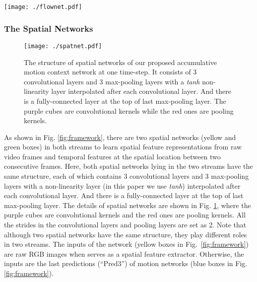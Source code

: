 \documentclass[journal]{IEEEtran}
\begin{document}
\begin{figure*}[htb]
	\centering
	\texttt{[image: ./flownet.pdf]}
	\vspace{-3.5mm}	
	\caption{The structure of motion networks of our proposed accumulative motion context network at one time-step.  It has 6 convolutional layers (corresponding to ``Conv1'', ``Conv\_1'', ``Conv2'', ``Conv2\_1'',``Conv3'' and ``Conv3\_1'' ) with stride of 2 in six of them and a tanh non-linearity layer after each layer. The inputs are the concatenated two person frames with size of $h \times w \times 6$. To provide dense per-pixel predictions, several deconvolutional layers are applied on output feature maps of convolutional layers and motion predictions to refine the coarse pooled representation. The purple cubes represent the convolutional kernels while the green cubes are the deconvolutional kernels. }
	
	\label{fig:flownet}
\end{figure*}

\subsubsection{The Spatial Networks}\label{spatial}
\begin{figure}[htb]
	\centering
	\texttt{[image: ./spatnet.pdf]}
	\vspace{-3.5mm}	
	\caption{The structure of spatial networks of our proposed accumulative motion context network at one time-step. It consists of 3 convolutional layers and 3 max-pooling layers with a \textit{tanh} non-linearity layer interpolated after each convolutional layer. And there is a fully-connected layer at the top of last max-pooling layer. The purple cubes are convolutional kernels while the red ones are pooling kernels.}
	
	\label{fig:spatnet}
\end{figure}
As shown in Fig. \ref{fig:framework}, there are two spatial networks (yellow and green boxes) in both streams to learn spatial feature representations from raw video frames and temporal features at the spatial location between two consecutive frames. Here, both spatial networks lying in the two streams have the same structure, each of which contains  3 convolutional layers and 3 max-pooling layers with a non-linearity layer (in this paper we use \textit{tanh}) interpolated after each convolutional layer. And there is a fully-connected layer at the top of last max-pooling layer. The details of spatial networks are shown in Fig. \ref{fig:spatnet}, where the purple cubes are convolutional kernels and the red ones are pooling kernels. All the strides in the convolutional layers and pooling layers are set as 2. Note that although two spatial networks have the same structure, they play different roles in two streams. The inputs of the network (yellow boxes in Fig.~\ref{fig:framework}) are raw RGB images when serves as a spatial feature extractor. Otherwise, the inputs are the last predictions (``Pred3'') of motion networks (blue boxes in Fig. \ref{fig:framework}). 
\end{document}
